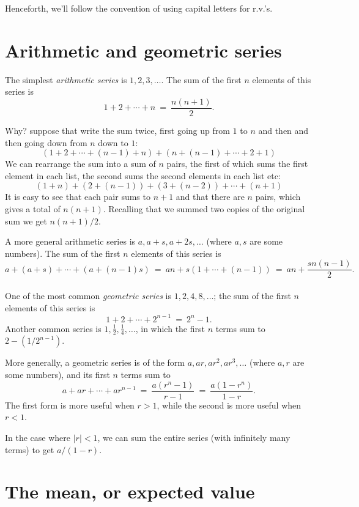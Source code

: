 Henceforth, we'll follow the convention of using capital letters for r.v.'s.

\section{Arithmetic and geometric series}

The simplest {\it arithmetic series} is $1,2,3,\ldots$. The sum of the first 
$n$ elements of this series is
$$ 1 + 2 + \cdots + n \ = \ \frac{n(n+1)}{2} .$$

Why? suppose that write the sum twice, first going up from $1$ to $n$
and then and then going down from $n$ down to $1$:
$$ \left(1 + 2 + \cdots + (n-1) + n\right) + 
\left(n + (n-1) + \cdots + 2 + 1\right) $$
We can rearrange the sum into a sum of $n$ pairs, the first of which
sums the first element in each list, the second sums the second
elements in each list etc:
$$ (1+n) + (2+(n-1)) + (3+(n-2)) + \cdots + (n+1) $$
It is easy to see that each pair sums to $n+1$ and that there are $n$
pairs, which gives a total of $n(n+1)$. Recalling that we summed two
copies of the original sum we get $n(n+1)/2$.

A more general arithmetic series is $a, a+s, a+2s, \ldots$
(where $a,s$ are some numbers). The sum of the first $n$ elements of this series is
$$ a + (a+s) + \cdots + (a + (n-1)s)
\ = \ 
an + s(1 + \cdots + (n-1))
\ = \ 
an + \frac{sn(n-1)}{2}.
$$
\\

One of the most common {\it geometric series} is $1, 2, 4, 8, \ldots$; the sum
of the first $n$ elements of this series is
$$ 1 + 2 + \cdots + 2^{n-1} \ = \ 2^n - 1 .$$
Another common series is $1, \frac{1}{2}, \frac{1}{4}, \ldots$,
in which the first $n$ terms sum to $2 - (1/2^{n-1})$.

More generally, a geometric series is of the form $a, ar, ar^2, ar^3, \ldots$
(where $a,r$ are some numbers), and its first $n$ terms sum to
$$ a + ar + \cdots + ar^{n-1} 
\ = \ 
\frac{a(r^n-1)}{r-1}
\ = \ 
\frac{a(1-r^n)}{1-r}.$$
The first form is more useful when $r > 1$, while the second is more useful when $r< 1$.

In the case where $|r| < 1$, we can sum the entire series (with infinitely many terms) 
to get $a/(1-r)$.

\section{The mean, or expected value}

